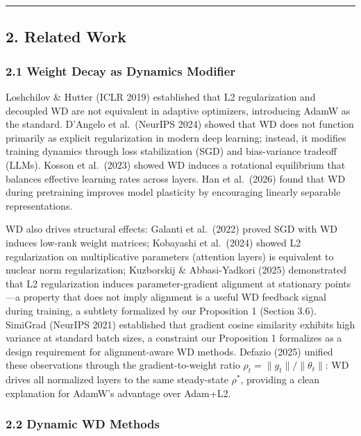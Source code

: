 \documentclass[
]{article}
\begin{document}
\begin{center}\rule{0.5\linewidth}{0.5pt}\end{center}

\hypertarget{related-work}{%
\subsection{2. Related Work}\label{related-work}}

\hypertarget{weight-decay-as-dynamics-modifier}{%
\subsubsection{2.1 Weight Decay as Dynamics
Modifier}\label{weight-decay-as-dynamics-modifier}}

Loshchilov \& Hutter (ICLR 2019) established that L2 regularization and
decoupled WD are not equivalent in adaptive optimizers, introducing
AdamW as the standard. D'Angelo et al.~(NeurIPS 2024) showed that WD
does not function primarily as explicit regularization in modern deep
learning; instead, it modifies training dynamics through loss
stabilization (SGD) and bias-variance tradeoff (LLMs). Kosson et
al.~(2023) showed WD induces a rotational equilibrium that balances
effective learning rates across layers. Han et al.~(2026) found that WD
during pretraining improves model plasticity by encouraging linearly
separable representations.

WD also drives structural effects: Galanti et al.~(2022) proved SGD with
WD induces low-rank weight matrices; Kobayashi et al.~(2024) showed L2
regularization on multiplicative parameters (attention layers) is
equivalent to nuclear norm regularization; Kuzborskij \& Abbasi-Yadkori
(2025) demonstrated that L2 regularization induces parameter-gradient
alignment at stationary points---a property that does not imply
alignment is a useful WD feedback signal during training, a subtlety
formalized by our Proposition 1 (Section 3.6). SimiGrad (NeurIPS 2021)
established that gradient cosine similarity exhibits high variance at
standard batch sizes, a constraint our Proposition 1 formalizes as a
design requirement for alignment-aware WD methods. Defazio (2025)
unified these observations through the gradient-to-weight ratio
\(\rho_t = \|g_t\| / \|\theta_t\|\): WD drives all normalized layers to
the same steady-state \(\rho^*\), providing a clean explanation for
AdamW's advantage over Adam+L2.

\hypertarget{dynamic-wd-methods}{%
\subsubsection{2.2 Dynamic WD Methods}\label{dynamic-wd-methods}}
\end{document}
